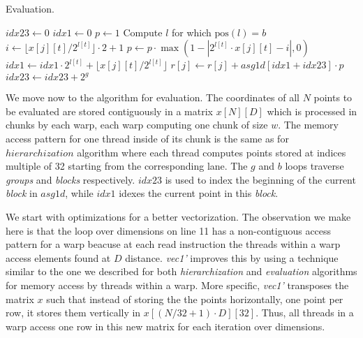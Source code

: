 \begin{algorithm}[tbp]
\small{
	\caption{Evaluation.}
	\label{alg:evaluation}
	\begin{algorithmic}[1]
    		\State $\textit{idx23} \leftarrow 0$
						\State $\textit{idx1} \leftarrow 0$
						\State $\textit{p} \leftarrow 1$
							\State Compute $l$ for which $\text{pos}(l) = b$
						\EndIf
							\State $i \leftarrow \lfloor x[j][t] / 2^{l[t]} \rfloor \cdot 2 + 1$
							\State $p \leftarrow p \cdot \max(1 - |2^{l[t]} \cdot x[j][t] - i|, 0)$
							\State $\textit{idx1} \leftarrow \textit{idx1} \cdot 2^{l[t]} + \lfloor	x[j][t] / 2^{l[t]} \rfloor$
						\EndFor
						\State $r[j] \leftarrow r[j] + \textit{asg1d}[\textit{idx1}	+\textit{idx23}] \cdot p$ 
						\State $\textit{idx23} \leftarrow \textit{idx23} + 2^g$
					\EndFor
				\EndFor
    		\EndFor
    	\EndProcedure
 	\end{algorithmic}
}
\end{algorithm}

We move now to the algorithm for evaluation. The coordinates of all $N$ points
to be evaluated are stored contiguously in a matrix $x[N][D]$ which is processed
in chunks by each warp, each warp computing one chunk of size $w$. The memory
access pattern for one thread inside of its chunk is the same as for
$hierarchization$ algorithm where each thread computes points stored at indices
multiple of 32 starting from the corresponding lane. The $g$ and $b$ loops
traverse \textit{groups} and \textit{blocks} respectively. $\textit{idx23}$ is
used to index the beginning of the current \textit{block} in $\textit{asg1d}$,
while $idx1$ idexes the current point in this \textit{block}.

We start with optimizations for a better vectorization. The observation we make
here is that the loop over dimensions on line 11 has a non-contiguous access
pattern for a warp beacuse at each read instruction the threads within a
warp access elements found at $D$ distance. \textit{vec1'} improves this by
using a technique similar to the one we described for both
\textit{hierarchization} and \textit{evaluation} algorithms for memory access by
threads within a warp. More specific, \textit{vec1'} transposes the matrix $x$
such that instead of storing the the points horizontally, one point per row, it
stores them vertically in $x[(N/32+1) \cdot D][32]$. Thus, all threads in a warp
access one row in this new matrix for each iteration over dimensions.

